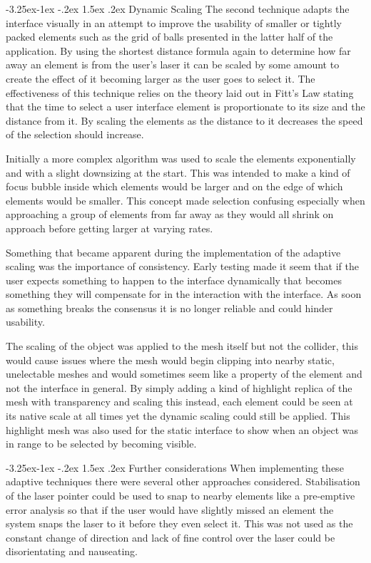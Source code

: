 \documentclass[12pt]{article}
\makeatletter
\renewcommand{\subsubsection}{\@startsection{subsubsection}{2}{\z@}%
             {-3.25ex\@plus -1ex \@minus -.2ex}%
             {1.5ex \@plus .2ex}%
             {\normalfont\normalsize\scshape\bfseries}}
\makeatother
\begin{document}
\subsubsection{Dynamic Scaling}
The second technique adapts the interface visually in an attempt to improve the usability of smaller or tightly packed elements such as the grid of balls presented in the latter half of the application. By using the shortest distance formula again to determine how far away an element is from the user's laser it can be scaled by some amount to create the effect of it becoming larger as the user goes to select it. The effectiveness of this technique relies on the theory laid out in Fitt's Law stating that the time to select a user interface element is proportionate to its size and the distance from it. By scaling the elements as the distance to it decreases the speed of the selection should increase.

Initially a more complex algorithm was used to scale the elements exponentially and with a slight downsizing at the start. This was intended to make a kind of focus bubble inside which elements would be larger and on the edge of which elements would be smaller. This concept made selection confusing especially when approaching a group of elements from far away as they would all shrink on approach before getting larger at varying rates.

Something that became apparent during the implementation of the adaptive scaling was the importance of consistency. Early testing made it seem that if the user expects something to happen to the interface dynamically that becomes something they will compensate for in the interaction with the interface. As soon as something breaks the consensus it is no longer reliable and could hinder usability.

The scaling of the object was applied to the mesh itself but not the collider, this would cause issues where the mesh would begin clipping into nearby static, unelectable meshes and would sometimes seem like a property of the element and not the interface in general. By simply adding a kind of highlight replica of the mesh with transparency and scaling this instead, each element could be seen at its native scale at all times yet the dynamic scaling could still be applied. This highlight mesh was also used for the static interface to show when an object was in range to be selected by becoming visible.

\subsubsection{Further considerations}
When implementing these adaptive techniques there were several other approaches considered. Stabilisation of the laser pointer could be used to snap to nearby elements like a pre-emptive error analysis so that if the user would have slightly missed an element the system snaps the laser to it before they even select it. This was not used as the constant change of direction and lack of fine control over the laser could be disorientating and nauseating.
\end{document}
